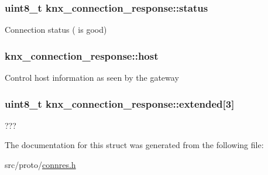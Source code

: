 \subsubsection[{\texorpdfstring{status}{status}}]{\setlength{\rightskip}{0pt plus 5cm}uint8\+\_\+t knx\+\_\+connection\+\_\+response\+::status}\hypertarget{structknx__connection__response_a5a7287455bcf54fa0d5accf44e4f227a}{}\label{structknx__connection__response_a5a7287455bcf54fa0d5accf44e4f227a}
Connection status ({} is good) 
\subsubsection[{\texorpdfstring{host}{host}}]{ knx\+\_\+connection\+\_\+response\+::host}\hypertarget{structknx__connection__response_aaad9c38a8731b4950e529c797f175fb7}{}\label{structknx__connection__response_aaad9c38a8731b4950e529c797f175fb7}
Control host information as seen by the gateway 
\subsubsection[{\texorpdfstring{extended}{extended}}]{\setlength{\rightskip}{0pt plus 5cm}uint8\+\_\+t knx\+\_\+connection\+\_\+response\+::extended\mbox{[}3\mbox{]}}\hypertarget{structknx__connection__response_a72e1af6c689193991c7f1a5a36bfdcf7}{}\label{structknx__connection__response_a72e1af6c689193991c7f1a5a36bfdcf7}
??? 

The documentation for this struct was generated from the following file\+:\begin{DoxyCompactItemize}
\item 
src/proto/\hyperlink{connres_8h}{connres.\+h}\end{DoxyCompactItemize}

